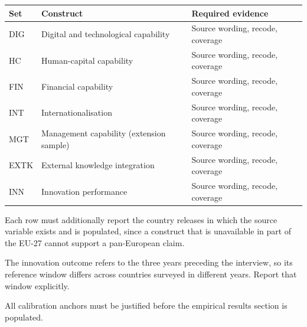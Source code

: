 \begin{longtable}{lll}
\toprule
Set & Construct & Required evidence \\
\midrule
\endhead
DIG & Digital and technological capability & Source wording, recode, coverage \\
HC & Human-capital capability & Source wording, recode, coverage \\
FIN & Financial capability & Source wording, recode, coverage \\
INT & Internationalisation & Source wording, recode, coverage \\
MGT & Management capability (extension sample) & Source wording, recode, coverage \\
EXTK & External knowledge integration & Source wording, recode, coverage \\
INN & Innovation performance & Source wording, recode, coverage \\
\bottomrule
\end{longtable}

Each row must additionally report the country releases in which the source
variable exists and is populated, since a construct that is unavailable in part
of the EU-27 cannot support a pan-European claim.

The innovation outcome refers to the three years preceding the interview, so its
reference window differs across countries surveyed in different years. Report
that window explicitly.

All calibration anchors must be justified before the empirical results section
is populated.
